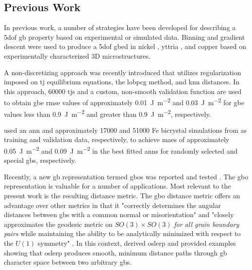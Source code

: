 \documentclass[preprint,12pt]{elsarticle}
\begin{document}
\subsection{Previous Work}
In previous work, a number of strategies have been developed for describing a \gls{5dof} \gls{gb} property based on experimental or simulated data. Binning and gradient descent were used to produce a \gls{5dof} \gls{gbed} in nickel \cite{liRelativeGrainBoundary2009}, yttria \cite{dillonCharacterizationGrainboundaryCharacter2009}, and copper \cite{randleFiveparameterGrainBoundary2008} based on experimentally characterized 3D microstructures. 

A non-discretizing approach was recently introduced \cite{shenDeterminingGrainBoundary2019} that utilizes regularization imposed on \gls{tj} equilibrium equations, the \gls{lobpcg} method, and \gls{knn} distances. In this approach, \num{60000} \glspl{tj} and a custom, non-smooth validation function are used to obtain \gls{gbe} \gls{rmse} values of approximately \SI{0.01}{\J\per\square\meter} and \SI{0.03}{\J\per\square\meter} for \gls{gbe} values less than \SI{0.9}{\J\per\square\meter} and greater than \SI{0.9}{\J\per\square\meter}, respectively. 

\citet{echeverrirestrepoUsingArtificialNeural2014} used an \gls{ann} and approximately \num{17000} and \num{51000} Fe bicrystal simulations from \citet{kimIdentificationSchemeGrain2011} as training and validation data, respectively, to achieve \glspl{mae} of approximately \SI{0.05}{\J\per\square\meter} and \SI{0.09}{\J\per\square\meter} in the best fitted \glspl{ann} for randomly selected and special \glspl{gb}, respectively. 

Recently, a new \gls{gb} representation termed \glspl{gbo} was reported \cite{francisGeodesicOctonionMetric2019} and tested \cite{chesserLearningGrainBoundary2020}. The \gls{gbo} representation is valuable for a number of applications. Most relevant to the present work is the resulting distance metric. The \gls{gbo} distance metric offers an advantage over other metrics in that it "correctly determines the angular distances between \glspl{gb} with a common normal or misorientation" and "closely approximates the geodesic metric on $SO(3) \times SO(3)$ \textit{for all grain boundary pairs} while maintaining the ability to be analytically minimized with respect to the $U(1)$ symmetry" \cite{francisGeodesicOctonionMetric2019}. In this context, \citet{francisGeodesicOctonionMetric2019} derived \gls{oslerp} and provided examples showing that \gls{oslerp} produces smooth, minimum distance paths through \gls{gb} character space between two arbitrary \glspl{gb}. 
\end{document}
